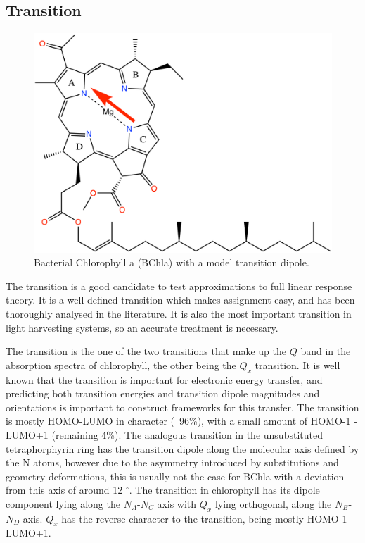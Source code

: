 \subsection{\Qy Transition}
\label{subsec:qy_transition}
\begin{figure}
    \centering
    \includegraphics{chapters/chapter03/chlorophyll_Qy.png}
    \caption{Bacterial Chlorophyll a (BChla) with a model \Qy transition dipole.}
    \label{fig:bchla_qy}
\end{figure}

The \Qy transition is a good candidate to test approximations to full linear response 
theory. It is a well-defined transition which makes assignment easy, and has been
thoroughly analysed in the literature. It is also the most important transition 
in light harvesting systems, so an accurate treatment is necessary. 

The \Qy transition is the one of the two transitions that make up the $Q$ band in
the absorption spectra of chlorophyll, the other being the $Q_x$ transition. It 
is well known that the \Qy transition is important for electronic energy transfer,
and predicting both transition energies and transition dipole magnitudes and orientations
is important to construct frameworks for this transfer. The \Qy transition is mostly
HOMO-LUMO in character (~96\%), with a small amount of HOMO-1 - LUMO+1 (remaining 4\%).
The analogous transition in the unsubstituted tetraphorphyrin ring has the transition
dipole along the molecular axis defined by the N atoms, however due to the asymmetry 
introduced by substitutions and geometry deformations, this is usually not the case 
for BChla with a deviation from this axis of around 12 $^{\circ}$. The \Qy transition
in chlorophyll has its dipole component lying along the $N_A$-$N_C$ axis with $Q_x$ 
lying orthogonal, along the $N_B$-$N_D$ axis. $Q_x$ has the reverse character to 
the \Qy transition, being mostly HOMO-1 - LUMO+1.

